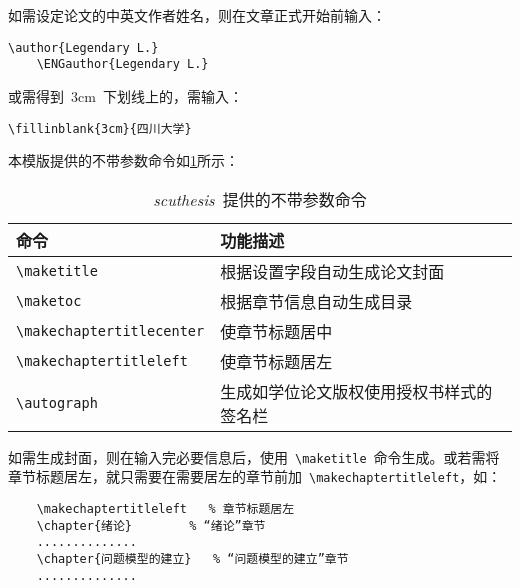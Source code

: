 如需设定论文的中英文作者姓名，则在文章正式开始前输入：
\begin{Verbatim}[gobble=1,frame=single]
	\author{Legendary L.}
	\ENGauthor{Legendary L.}
\end{Verbatim}


或需得到~3cm~下划线上的，需输入：
\begin{Verbatim}[gobble=1,frame=single]
	\fillinblank{3cm}{四川大学}
\end{Verbatim}


本模版提供的不带参数命令如\cref{table_ProvidedCommandsWithoutPar}所示：
\begin{table}[h]
	\caption{\emph{scuthesis}~提供的不带参数命令}
	\label{table_ProvidedCommandsWithoutPar}
	\begin{tabular*}{\textwidth}{l@{\extracolsep{\fill}}p{}}
		\toprule
		\textbf{命令} & \textbf{功能描述} \\
		\midrule
		\verb|\maketitle| & 根据设置字段自动生成论文封面\\
		\verb|\maketoc| & 根据章节信息自动生成目录\\
		\verb|\makechaptertitlecenter| & 使章节标题居中\\
		\verb|\makechaptertitleleft| & 使章节标题居左\\
		\verb|\autograph| & 生成如学位论文版权使用授权书样式的签名栏\\
		\bottomrule
	\end{tabular*}
\end{table}


如需生成封面，则在输入完必要信息后，使用~\verb|\maketitle|~命令生成。或若需将章节标题居左，就只需要在需要居左的章节前加~\verb|\makechaptertitleleft|，如：
\begin{Verbatim}
	\makechaptertitleleft	% 章节标题居左
	\chapter{绪论}		% “绪论”章节
	..............
	\chapter{问题模型的建立}	% “问题模型的建立”章节
	..............
\end{Verbatim}

